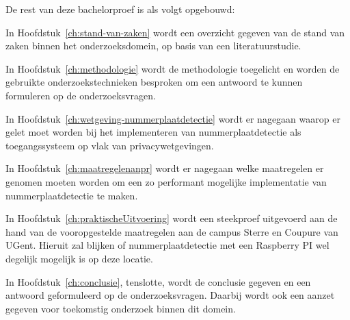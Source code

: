 
De rest van deze bachelorproef is als volgt opgebouwd:

In Hoofdstuk~\ref{ch:stand-van-zaken} wordt een overzicht gegeven van de stand van zaken binnen het onderzoeksdomein, op basis van een literatuurstudie.

In Hoofdstuk~\ref{ch:methodologie} wordt de methodologie toegelicht en worden de gebruikte onderzoekstechnieken besproken om een antwoord te kunnen formuleren op de onderzoeksvragen.

In Hoofdstuk~\ref{ch:wetgeving-nummerplaatdetectie} wordt er nagegaan waarop er gelet moet worden bij het implementeren van nummerplaatdetectie als toegangssysteem op vlak van privacywetgevingen.

In Hoofdstuk~\ref{ch:maatregelenanpr} wordt er nagegaan welke maatregelen er genomen moeten worden om een zo performant mogelijke implementatie van nummerplaatdetectie te maken.

In Hoofdstuk~\ref{ch:praktischeUitvoering} wordt een steekproef uitgevoerd aan de hand van de vooropgestelde maatregelen aan de campus Sterre en Coupure van UGent. Hieruit zal blijken of nummerplaatdetectie met een Raspberry PI wel degelijk mogelijk is op deze locatie.

In Hoofdstuk~\ref{ch:conclusie}, tenslotte, wordt de conclusie gegeven en een antwoord geformuleerd op de onderzoeksvragen. Daarbij wordt ook een aanzet gegeven voor toekomstig onderzoek binnen dit domein.